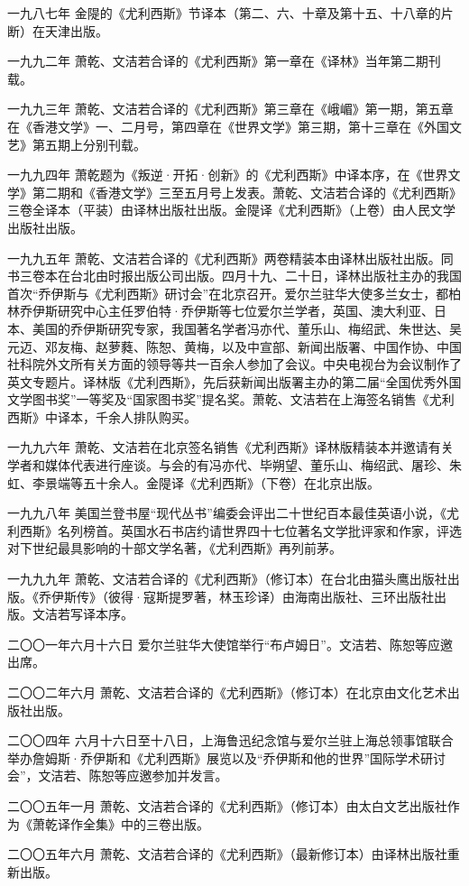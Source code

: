 \par 一九八七年 金隄的《尤利西斯》节译本（第二、六、十章及第十五、十八章的片断）在天津出版。
\par 一九九二年 萧乾、文洁若合译的《尤利西斯》第一章在《译林》当年第二期刊载。
\par 一九九三年 萧乾、文洁若合译的《尤利西斯》第三章在《峨嵋》第一期，第五章在《香港文学》一、二月号，第四章在《世界文学》第三期，第十三章在《外国文艺》第五期上分别刊载。
\par 一九九四年 萧乾题为《叛逆·开拓·创新》的《尤利西斯》中译本序，在《世界文学》第二期和《香港文学》三至五月号上发表。萧乾、文洁若合译的《尤利西斯》三卷全译本（平装）由译林出版社出版。金隄译《尤利西斯》（上卷）由人民文学出版社出版。
\par 一九九五年 萧乾、文洁若合译的《尤利西斯》两卷精装本由译林出版社出版。同书三卷本在台北由时报出版公司出版。四月十九、二十日，译林出版社主办的我国首次“乔伊斯与《尤利西斯》研讨会”在北京召开。爱尔兰驻华大使多兰女士，都柏林乔伊斯研究中心主任罗伯特·乔伊斯等七位爱尔兰学者，英国、澳大利亚、日本、美国的乔伊斯研究专家，我国著名学者冯亦代、董乐山、梅绍武、朱世达、吴元迈、邓友梅、赵萝蕤、陈恕、黄梅，以及中宣部、新闻出版署、中国作协、中国社科院外文所有关方面的领导等共一百余人参加了会议。中央电视台为会议制作了英文专题片。译林版《尤利西斯》，先后获新闻出版署主办的第二届“全国优秀外国文学图书奖”一等奖及“国家图书奖”提名奖。萧乾、文洁若在上海签名销售《尤利西斯》中译本，千余人排队购买。
\par 一九九六年 萧乾、文洁若在北京签名销售《尤利西斯》译林版精装本并邀请有关学者和媒体代表进行座谈。与会的有冯亦代、毕朔望、董乐山、梅绍武、屠珍、朱虹、李景端等五十余人。金隄译《尤利西斯》（下卷）在北京出版。
\par 一九九八年 美国兰登书屋“现代丛书”编委会评出二十世纪百本最佳英语小说，《尤利西斯》名列榜首。英国水石书店约请世界四十七位著名文学批评家和作家，评选对下世纪最具影响的十部文学名著，《尤利西斯》再列前茅。
\par 一九九九年 萧乾、文洁若合译的《尤利西斯》（修订本）在台北由猫头鹰出版社出版。《乔伊斯传》（彼得·寇斯提罗著，林玉珍译）由海南出版社、三环出版社出版。文洁若写译本序。
\par 二〇〇一年六月十六日 爱尔兰驻华大使馆举行“布卢姆日”。文洁若、陈恕等应邀出席。
\par 二〇〇二年六月 萧乾、文洁若合译的《尤利西斯》（修订本）在北京由文化艺术出版社出版。
\par 二〇〇四年 六月十六日至十八日，上海鲁迅纪念馆与爱尔兰驻上海总领事馆联合举办詹姆斯·乔伊斯和《尤利西斯》展览以及“乔伊斯和他的世界”国际学术研讨会”，文洁若、陈恕等应邀参加并发言。
\par 二〇〇五年一月 萧乾、文洁若合译的《尤利西斯》（修订本）由太白文艺出版社作为《萧乾译作全集》中的三卷出版。
\par 二〇〇五年六月 萧乾、文洁若合译的《尤利西斯》（最新修订本）由译林出版社重新出版。

